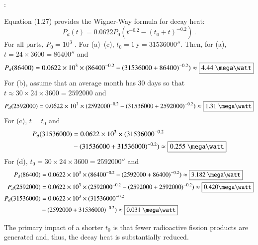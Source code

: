 {
\color{purple}

:

Equation (1.27) provides the Wigner-Way formula for decay heat:
\begin{equation*}
 P_d(t) = 0.0622 P_0 (t^{-0.2} - (t_0 + t)^{-0.2}) \, .
\end{equation*}
For all parts, $P_0 = 10^3$ \mega\watt. For (a)--(c), $t_0 = 1~\text{y} = 31536000\second$.
Then, for (a), $t = 24\times 3600 = 86400\second$ and
\begin{equation*}
 \begin{split}
   P_d(86400)
    &= 0.0622 \times 10^3 \times (86400^{-0.2} - (31536000+86400)^{-0.2}) \approx \boxed{4.44~\mega\watt} \\
 \end{split}
\end{equation*}
For (b), assume that an average month has 30 days so that
$t\approx 30\times24\times 3600=2592000$ and
\begin{equation*}
 \begin{split}
   P_d(2592000)
    &= 0.0622 \times 10^3 \times (2592000^{-0.2} - (31536000+2592000)^{-0.2}) \approx \boxed{1.31~\mega\watt} \\
 \end{split}
\end{equation*}
For (c), $t=t_0$ and
\begin{equation*}
 \begin{split}
   P_d(31536000)
    &= 0.0622 \times 10^3 \times (31536000^{-0.2} \\
    &- (31536000+31536000)^{-0.2}) \approx \boxed{0.255~\mega\watt} \\
 \end{split}
\end{equation*}
For (d), $t_0 = 30\times 24\times 3600 =2592000\second$ and
\begin{equation*}
 \begin{split}
   P_d(86400)
    &= 0.0622 \times 10^3 \times (86400^{-0.2} - (2592000+86400)^{-0.2}) \approx \boxed{3.182~\mega\watt} \\
   P_d(2592000)
    &= 0.0622 \times 10^3 \times (2592000^{-0.2} - (2592000+2592000)^{-0.2}) \approx \boxed{0.420\mega\watt} \\
   P_d(31536000)
    &= 0.0622 \times 10^3 \times (31536000^{-0.2} \\
    &- (2592000+31536000)^{-0.2}) \approx \boxed{0.031~\mega\watt} \\
 \end{split}
\end{equation*}

The primary impact of a shorter $t_0$ is that fewer radioactive fission products are generated and, thus, the decay heat is substantially reduced.

}
\newpage
\else
\fi

